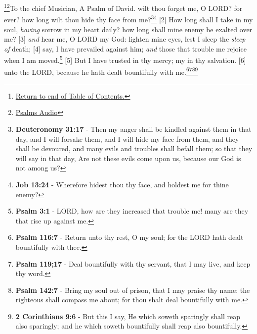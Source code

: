 \footnote{\textcolor[cmyk]{0.99998,1,0,0}{\hyperlink{TOC}{Return to end of Table of Contents.}}}\footnote{\href{https://www.audioverse.org/english/audiobibles/books/ENGKJV/O/Ps/1}{\textcolor[cmyk]{0.99998,1,0,0}{Psalms Audio}}}\textcolor[cmyk]{0.99998,1,0,0}{To the chief Musician, A Psalm of David.} %
\textcolor[cmyk]{0.99998,1,0,0}{ wilt thou forget me, O LORD? for ever? how long wilt thou hide thy face from me?}\footnote{\textbf{Deuteronomy 31:17} - Then my anger shall be kindled against them in that day, and I will forsake them, and I will hide my face from them, and they shall be devoured, and many evils and troubles shall befall them; so that they will say in that day, Are not these evils come upon us, because our God is not among us?}\footnote{\textbf{Job 13:24} - Wherefore hidest thou thy face, and holdest me for thine enemy?}
[2] \textcolor[cmyk]{0.99998,1,0,0}{How long shall I take  in my soul, \emph{having} sorrow in my heart daily? how long shall mine enemy be exalted over me?}
[3] \textcolor[cmyk]{0.99998,1,0,0}{ \emph{and} hear me, O LORD my God: lighten mine eyes, lest I sleep the \emph{sleep} \emph{of} death;}
[4] \textcolor[cmyk]{0.99998,1,0,0}{ say, I have prevailed against him; \emph{and} those that trouble me rejoice when I am moved.}\footnote{\textbf{Psalm 3:1} -  LORD, how are they increased that trouble me! many are they that rise up against me.}
[5] \textcolor[cmyk]{0.99998,1,0,0}{But I have trusted in thy mercy; my  in thy salvation.}
[6] \textcolor[cmyk]{0.99998,1,0,0}{ unto the LORD, because he hath dealt bountifully with me.}\footnote{\textbf{Psalm 116:7} - Return unto thy rest, O my soul; for the LORD hath dealt bountifully with thee.}\footnote{\textbf{Psalm 119;17} - Deal bountifully with thy servant, that I may live, and keep thy word.}\footnote{\textbf{Psalm 142:7} - Bring my soul out of prison, that I may praise thy name: the righteous shall compass me about; for thou shalt deal bountifully with me.}\footnote{\textbf{2 Corinthians 9:6} - But this I say, He which soweth sparingly shall reap also sparingly; and he which soweth bountifully shall reap also bountifully.}



